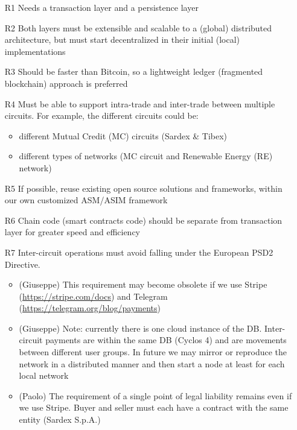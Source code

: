 \begin{itemize}

\item[R1] Needs a transaction layer and a persistence layer

\item[R2] Both layers must be extensible and scalable to a (global) distributed architecture, but must start decentralized in their initial (local) implementations

\item[R3] Should be faster than Bitcoin, so a lightweight ledger (fragmented blockchain) approach is preferred

\item[R4] Must be able to support intra-trade and inter-trade between multiple circuits. For example, the different circuits could be:
\begin{itemize}
	\item {different Mutual Credit (MC) circuits (Sardex \& Tibex)}
	\item {different types of networks (MC circuit and Renewable Energy (RE) network)}
\end{itemize}


\item[R5] If possible, reuse existing open source solutions and frameworks, within our own
customized ASM/ASIM framework

\item[R6] Chain code (smart contracts code) should be separate from transaction layer for greater speed and efficiency

\item[R7] Inter-circuit operations must avoid falling under the European PSD2 Directive.
\begin{itemize}
	\item (Giuseppe) This requirement may become obsolete if we use Stripe (\url{https://stripe.com/docs}) and Telegram (\url{https://telegram.org/blog/payments})
	\item (Giuseppe) Note: currently there is one cloud instance of the DB. Inter-circuit payments are within the same DB (Cyclos 4) and are movements between different user groups. In future we may mirror or reproduce the network in a distributed manner and then start a node at least for each local network
	\item (Paolo) The requirement of a single point of legal liability remains even if we use
Stripe. Buyer and seller must each have a contract with the same entity (Sardex
S.p.A.)
\end{itemize}



\end{itemize}
